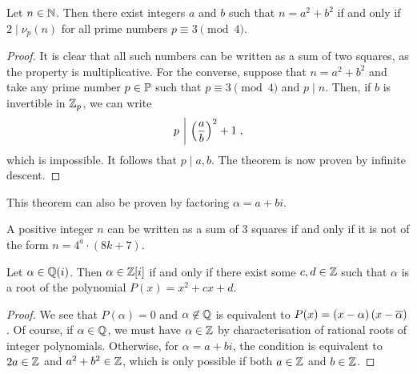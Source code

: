 \begin{izrek}
Let $n \in \N$. Then there exist integers $a$ and $b$ such that
$n = a^2 + b^2$ if and only if $2 \mid \nu_p(n)$ for all prime
numbers $p \equiv 3 \pmod{4}$.
\end{izrek}

\begin{proof}
It is clear that all such numbers can be written as a sum of two
squares, as the property is multiplicative. For the converse,
suppose that $n = a^2 + b^2$ and take any prime number $p \in \P$
such that $p \equiv 3 \pmod{4}$ and $p \mid n$. Then, if $b$ is
invertible in $\Z_p$, we can write
\[
\left.p~\middle\vert~\br{\frac{a}{b}}^2 + 1\right.,
\]
which is impossible. It follows that $p \mid a, b$. The theorem is
now proven by infinite descent.
\end{proof}

\begin{opomba}
This theorem can also be proven by factoring $\alpha = a + bi$.
\end{opomba}

\begin{opomba}
A positive integer $n$ can be written as a sum of $3$ squares if
and only if it is not of the form $n = 4^a \cdot (8k+7)$.
\end{opomba}

\begin{trditev}
Let $\alpha \in \Q(i)$. Then $\alpha \in \Z[i]$ if and only if
there exist some $c, d \in \Z$ such that $\alpha$ is a root of the
polynomial $P(x) = x^2 + cx + d$.
\end{trditev}

\begin{proof}
We see that $P(\alpha) = 0$ and $\alpha \not \in \Q$ is equivalent
to $P(x) = (x - \alpha) \br{x - \oline{\alpha}}$. Of course, if
$\alpha \in \Q$, we must have $\alpha \in \Z$ by 
characterisation of rational roots of integer polynomials.
Otherwise, for $\alpha = a + bi$, the condition is equivalent to
$2a \in \Z$ and $a^2 + b^2 \in \Z$, which is only possible if both
$a \in \Z$ and $b \in \Z$.
\end{proof}
